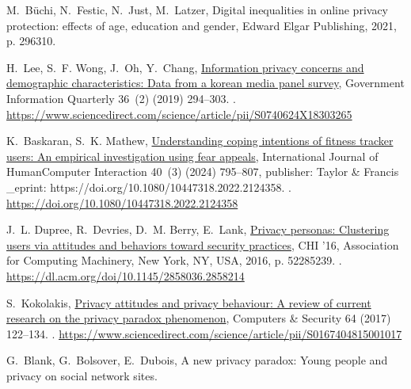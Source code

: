 \documentclass[
  number]{elsarticle}
\begin{document}
\begin{thebibliography}{10}
M.~{Büchi}, N.~Festic, N.~Just, M.~Latzer, Digital inequalities in online privacy protection: effects of age, education and gender, Edward Elgar Publishing, 2021, p. 296{\textendash}310.

H.~Lee, S.~F. Wong, J.~Oh, Y.~Chang, \href{https://www.sciencedirect.com/science/article/pii/S0740624X18303265}{Information privacy concerns and demographic characteristics: Data from a korean media panel survey}, Government Information Quarterly 36~(2) (2019) 294--303.
\newblock \href {https://doi.org/10.1016/j.giq.2019.01.002} {}.
\newline\urlprefix\url{https://www.sciencedirect.com/science/article/pii/S0740624X18303265}

K.~Baskaran, S.~K. Mathew, \href{https://doi.org/10.1080/10447318.2022.2124358}{Understanding coping intentions of fitness tracker users: An empirical investigation using fear appeals}, International Journal of Human{\textendash}Computer Interaction 40~(3) (2024) 795--807, publisher: Taylor \& Francis {\_}eprint: https://doi.org/10.1080/10447318.2022.2124358.
\newblock \href {https://doi.org/10.1080/10447318.2022.2124358} {}.
\newline\urlprefix\url{https://doi.org/10.1080/10447318.2022.2124358}

J.~L. Dupree, R.~Devries, D.~M. Berry, E.~Lank, \href{https://dl.acm.org/doi/10.1145/2858036.2858214}{Privacy personas: Clustering users via attitudes and behaviors toward security practices}, CHI '16, Association for Computing Machinery, New York, NY, USA, 2016, p. 5228{\textendash}5239.
\newblock \href {https://doi.org/10.1145/2858036.2858214} {}.
\newline\urlprefix\url{https://dl.acm.org/doi/10.1145/2858036.2858214}

S.~Kokolakis, \href{https://www.sciencedirect.com/science/article/pii/S0167404815001017}{Privacy attitudes and privacy behaviour: A review of current research on the privacy paradox phenomenon}, Computers \& Security 64 (2017) 122--134.
\newblock \href {https://doi.org/10.1016/j.cose.2015.07.002} {}.
\newline\urlprefix\url{https://www.sciencedirect.com/science/article/pii/S0167404815001017}

G.~Blank, G.~Bolsover, E.~Dubois, A new privacy paradox: Young people and privacy on social network sites\href {https://doi.org/10.2139/ssrn.2479938} {}.


\end{thebibliography}
\end{document}
